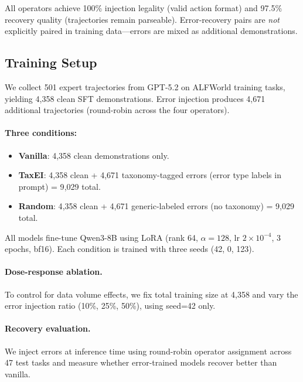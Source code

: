 All operators achieve 100\% injection legality (valid action format) and 97.5\% recovery quality (trajectories remain parseable). Error-recovery pairs are \emph{not} explicitly paired in training data---errors are mixed as additional demonstrations.

\subsection{Training Setup}
\label{sec:training_setup}

We collect 501 expert trajectories from GPT-5.2 on ALFWorld training tasks, yielding 4{,}358 clean SFT demonstrations. Error injection produces 4{,}671 additional trajectories (round-robin across the four operators).

\paragraph{Three conditions:}
\begin{itemize}[nosep,leftmargin=*]
\item \textbf{Vanilla}: 4{,}358 clean demonstrations only.
\item \textbf{TaxEI}: 4{,}358 clean + 4{,}671 taxonomy-tagged errors (error type labels in prompt) = 9{,}029 total.
\item \textbf{Random}: 4{,}358 clean + 4{,}671 generic-labeled errors (no taxonomy) = 9{,}029 total.
\end{itemize}

All models fine-tune Qwen3-8B using LoRA (rank 64, $\alpha{=}128$, lr $2{\times}10^{-4}$, 3 epochs, bf16). Each condition is trained with three seeds (42, 0, 123).

\paragraph{Dose-response ablation.} To control for data volume effects, we fix total training size at 4{,}358 and vary the error injection ratio (10\%, 25\%, 50\%), using seed=42 only.

\paragraph{Recovery evaluation.} We inject errors at inference time using round-robin operator assignment across 47 test tasks and measure whether error-trained models recover better than vanilla.
